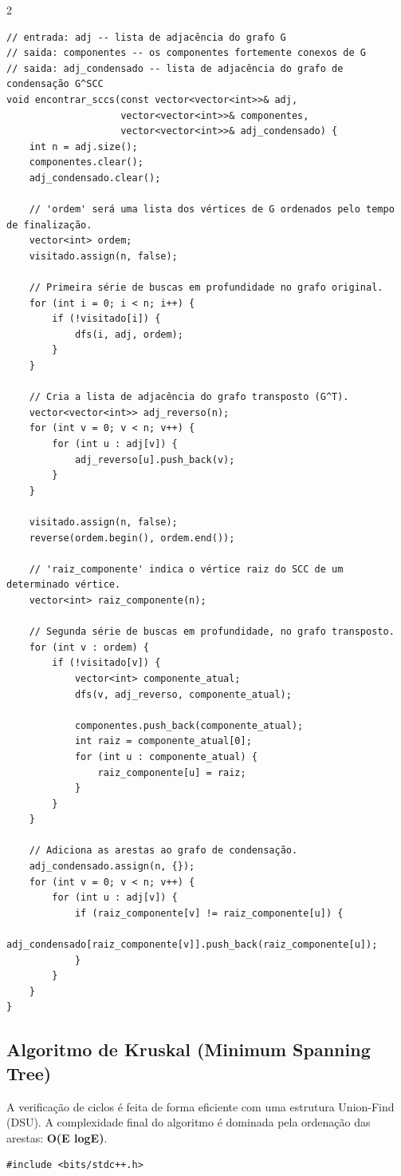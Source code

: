 \documentclass[11pt]{article}
\begin{document}
\begin{multicols}{2}
\begin{lstlisting}
// entrada: adj -- lista de adjacência do grafo G
// saida: componentes -- os componentes fortemente conexos de G
// saida: adj_condensado -- lista de adjacência do grafo de condensação G^SCC
void encontrar_sccs(const vector<vector<int>>& adj,
                    vector<vector<int>>& componentes,
                    vector<vector<int>>& adj_condensado) {
    int n = adj.size();
    componentes.clear();
    adj_condensado.clear();

    // 'ordem' será uma lista dos vértices de G ordenados pelo tempo de finalização.
    vector<int> ordem;
    visitado.assign(n, false);

    // Primeira série de buscas em profundidade no grafo original.
    for (int i = 0; i < n; i++) {
        if (!visitado[i]) {
            dfs(i, adj, ordem);
        }
    }

    // Cria a lista de adjacência do grafo transposto (G^T).
    vector<vector<int>> adj_reverso(n);
    for (int v = 0; v < n; v++) {
        for (int u : adj[v]) {
            adj_reverso[u].push_back(v);
        }
    }

    visitado.assign(n, false);
    reverse(ordem.begin(), ordem.end());

    // 'raiz_componente' indica o vértice raiz do SCC de um determinado vértice.
    vector<int> raiz_componente(n);

    // Segunda série de buscas em profundidade, no grafo transposto.
    for (int v : ordem) {
        if (!visitado[v]) {
            vector<int> componente_atual;
            dfs(v, adj_reverso, componente_atual);
            
            componentes.push_back(componente_atual);
            int raiz = componente_atual[0];
            for (int u : componente_atual) {
                raiz_componente[u] = raiz;
            }
        }
    }

    // Adiciona as arestas ao grafo de condensação.
    adj_condensado.assign(n, {});
    for (int v = 0; v < n; v++) {
        for (int u : adj[v]) {
            if (raiz_componente[v] != raiz_componente[u]) {
                adj_condensado[raiz_componente[v]].push_back(raiz_componente[u]);
            }
        }
    }
}
\end{lstlisting}

\subsection{Algoritmo de Kruskal (Minimum Spanning Tree)}
A verificação de ciclos é feita de forma eficiente com uma estrutura Union-Find (DSU). A complexidade final do algoritmo é dominada pela ordenação das arestas: \textbf{O(E logE)}.
\begin{lstlisting}
#include <bits/stdc++.h>


\end{lstlisting}
\end{multicols}
\end{document}
